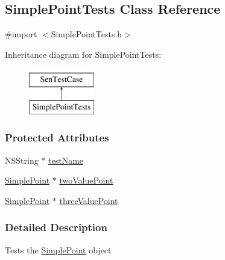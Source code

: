\hypertarget{interface_simple_point_tests}{\subsection{Simple\-Point\-Tests Class Reference}
\label{df/dbc/interface_simple_point_tests}
}


{\ttfamily \#import $<$Simple\-Point\-Tests.\-h$>$}

Inheritance diagram for Simple\-Point\-Tests\-:\begin{figure}[H]
\begin{center}
\leavevmode
\includegraphics[height=2.000000cm]{df/dbc/interface_simple_point_tests}
\end{center}
\end{figure}
\subsubsection*{Protected Attributes}
\begin{DoxyCompactItemize}
\item 
N\-S\-String $\ast$ \hyperlink{interface_simple_point_tests_a649cb8fc74d522648b3d242a79d67c52}{test\-Name}
\item 
\hyperlink{interface_simple_point}{Simple\-Point} $\ast$ \hyperlink{interface_simple_point_tests_a7de54d867fc86e46d98627fd689508f6}{two\-Value\-Point}
\item 
\hyperlink{interface_simple_point}{Simple\-Point} $\ast$ \hyperlink{interface_simple_point_tests_a3eaccf68ce0b22a31daba1edb2e70762}{three\-Value\-Point}
\end{DoxyCompactItemize}


\subsubsection{Detailed Description}
Tests the \hyperlink{interface_simple_point}{Simple\-Point} object 

